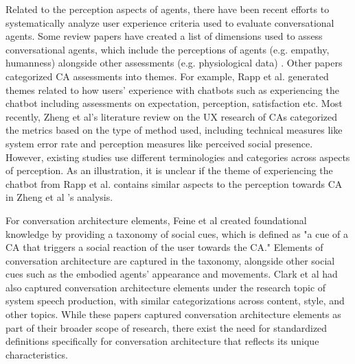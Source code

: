 \documentclass[sigconf,screen,review, anonymous]{acmart}
\begin{document}

Related to the perception aspects of agents, there have been recent efforts to systematically analyze user experience criteria used to evaluate conversational agents. Some review papers have created a list of dimensions used to assess conversational agents, which include the perceptions of agents (e.g. empathy, humanness) alongside other assessments (e.g. physiological data) \cite{clark2019state}\cite{finch2020towards}.
Other papers categorized CA assessments into themes. For example, Rapp et al. \cite{rapp2021human} generated themes related to how users' experience with chatbots such as experiencing the chatbot including assessments on expectation, perception, satisfaction etc. Most recently, Zheng et al's literature review on the UX research of CAs \cite{zheng2022ux} categorized the metrics based on the type of method used, including technical measures like system error rate and perception measures like perceived social presence. However, existing studies use different terminologies and categories across aspects of perception. As an illustration, it is unclear if the theme of experiencing the chatbot from Rapp et al. \cite{rapp2021human} contains similar aspects to the perception towards CA in Zheng et al \cite{zheng2022ux}'s analysis.
 
For conversation architecture elements, Feine et al \cite{feine2019taxonomy} created foundational knowledge by providing a taxonomy of social cues, which is defined as "a cue of a CA that triggers a social reaction of the user towards the CA." Elements of conversation architecture are captured in the taxonomy, alongside other social cues such as the embodied agents' appearance and movements. Clark et al \cite{clark2019state} had also captured conversation architecture elements under the research topic of system speech production, with similar categorizations across content, style, and other topics. While these papers captured conversation architecture elements as part of their broader scope of research, there exist the need for standardized definitions specifically for conversation architecture that reflects its unique characteristics.
\end{document}
